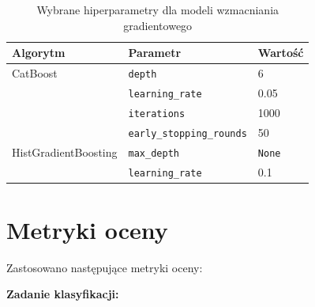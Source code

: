 \begin{table}[htbp]
\centering
\caption{Wybrane hiperparametry dla modeli wzmacniania gradientowego}
\label{tab:hiperparametry}
\small
\begin{tabular}{|l|l|l|}
\hline
\rowcolor{LightGray}
\textbf{Algorytm} & \textbf{Parametr} & \textbf{Wartość} \\
\hline
CatBoost & \texttt{depth} & 6 \\
 & \texttt{learning\_rate} & 0.05 \\
 & \texttt{iterations} & 1000 \\
 & \texttt{early\_stopping\_rounds} & 50 \\
\hline
HistGradientBoosting & \texttt{max\_depth} & \texttt{None} \\
 & \texttt{learning\_rate} & 0.1 \\
\hline
\end{tabular}
\end{table}

\section{Metryki oceny}
\label{sec:metryki-oceny}

Zastosowano następujące metryki oceny:

\textbf{Zadanie klasyfikacji:}

